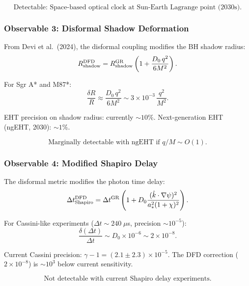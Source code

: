 \documentclass[11pt,a4paper]{article}
\begin{document}
\begin{equation}
\boxed{\text{Detectable: Space-based optical clock at Sun-Earth Lagrange point (2030s).}}
\end{equation}

\subsubsection{Observable 3: Disformal Shadow Deformation}

From Devi et al.\ (2024), the disformal coupling modifies the BH shadow radius:
\begin{equation}
R_{\rm shadow}^{\rm DFD} = R_{\rm shadow}^{\rm GR}\left(1 + \frac{D_0\,q^2}{6M^2}\right).
\end{equation}

For Sgr A* and M87*:
\begin{equation}
\frac{\delta R}{R} \approx \frac{D_0\,q^2}{6M^2} \sim 3 \times 10^{-3}\,\frac{q^2}{M^2}.
\end{equation}

EHT precision on shadow radius: currently $\sim 10\%$. Next-generation EHT (ngEHT, 2030): $\sim 1\%$.

\begin{equation}
\boxed{\text{Marginally detectable with ngEHT if $q/M \sim O(1)$.}}
\end{equation}

\subsubsection{Observable 4: Modified Shapiro Delay}

The disformal metric modifies the photon time delay:
\begin{equation}
\Delta t_{\rm Shapiro}^{\rm DFD} = \Delta t^{\rm GR}\left(1 + D_0\frac{(\hat{k}\cdot\nabla\psi)^2}{a_*^2(1+\chi)^2}\right).
\end{equation}

For Cassini-like experiments ($\Delta t \sim 240\;\mu$s, precision $\sim 10^{-5}$):
\begin{equation}
\frac{\delta(\Delta t)}{\Delta t} \sim D_0 \times 10^{-6} \sim 2 \times 10^{-8}.
\end{equation}

Current Cassini precision: $\gamma - 1 = (2.1 \pm 2.3) \times 10^{-5}$. The DFD correction ($2 \times 10^{-8}$) is $\sim 10^3$ below current sensitivity.

\begin{equation}
\boxed{\text{Not detectable with current Shapiro delay experiments.}}
\end{equation}
\end{document}

